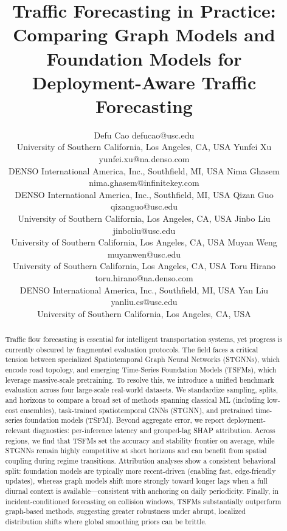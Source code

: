 \documentclass[10pt]{article}
\title{Traffic Forecasting in Practice: \\ Comparing Graph Models and
Foundation Models for Deployment-Aware Traffic Forecasting}
\author{%
  \name Defu Cao \email defucao@usc.edu \\
  \addr University of Southern California, Los Angeles, CA, USA
  \AND
  \name Yunfei Xu \email yunfei.xu@na.denso.com \\
  \addr DENSO International America, Inc., Southfield, MI, USA
  \AND
  \name Nima Ghasem \email nima.ghasem@infinitekey.com \\
  \addr DENSO International America, Inc., Southfield, MI, USA
  \AND
  \name Qizan Guo \email qizanguo@usc.edu \\
  \addr University of Southern California, Los Angeles, CA, USA
  \AND
  \name Jinbo Liu \email jinboliu@usc.edu \\
  \addr University of Southern California, Los Angeles, CA, USA
  \AND
  \name Muyan Weng \email muyanwen@usc.edu \\
  \addr University of Southern California, Los Angeles, CA, USA
  \AND
  \name Toru Hirano \email toru.hirano@na.denso.com \\
  \addr DENSO International America, Inc., Southfield, MI, USA
  \AND
  \name Yan Liu \email yanliu.cs@usc.edu \\
  \addr University of Southern California, Los Angeles, CA, USA
}
\begin{document}
\maketitle

\begin{abstract}
Traffic flow forecasting is essential for intelligent transportation systems, yet progress is currently obscured by fragmented evaluation protocols. The field faces a critical tension between specialized Spatiotemporal Graph Neural Networks (STGNNs), which encode road topology, and emerging Time-Series Foundation Models (TSFMs), which leverage massive-scale pretraining. To resolve this, we introduce a unified benchmark evaluation across four large-scale real-world datasets. We standardize sampling, splits, and horizons to compare a broad set of methods spanning classical ML (including low-cost ensembles), task-trained spatiotemporal GNNs (STGNN), and pretrained time-series foundation models (TSFM). Beyond aggregate error, we report deployment-relevant diagnostics: per-inference latency and grouped-lag SHAP attribution. Across regions, we find that TSFMs set the accuracy and stability frontier on average, while STGNNs remain highly competitive at short horizons and can benefit from spatial coupling during regime transitions. Attribution analyses show a consistent behavioral split: foundation models are typically more recent-driven (enabling fast, edge-friendly updates), whereas graph models shift more strongly toward longer lags when a full diurnal context is available---consistent with anchoring on daily periodicity. Finally, in incident-conditioned forecasting on collision windows, TSFMs substantially outperform graph-based methods, suggesting greater robustness under abrupt, localized distribution shifts where global smoothing priors can be brittle.
\end{abstract}

\end{document}
